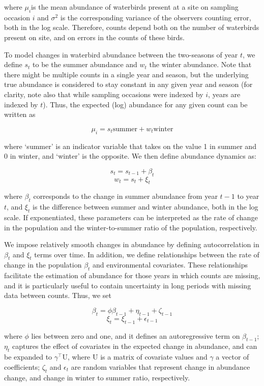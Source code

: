 \documentclass[utf8]{frontiersSCNS}
\begin{document}
where \(\mu_i\)is the mean abundance of waterbirds present at a site on
sampling occasion \(i\) and \(\sigma^2\) is the corresponding variance
of the observers counting error, both in the log scale. Therefore,
counts depend both on the number of waterbirds present on site, and on
errors in the counts of these birds.

To model changes in waterbird abundance between the two-seasons of year
\(t\), we define \(s_t\) to be the summer abundance and \(w_t\) the
winter abundance. Note that there might be multiple counts in a single
year and season, but the underlying true abundance is considered to stay
constant in any given year and season (for clarity, note also that while
sampling occasions were indexed by \(i\), years are indexed by \(t\)).
Thus, the expected (log) abundance for any given count can be written as

\[\mu_{i} = s_t \textrm{summer} + w_t \textrm{winter}\]

where `summer' is an indicator variable that takes on the value 1 in
summer and 0 in winter, and `winter' is the opposite. We then define
abundance dynamics as:

\[s_t = s_{t-1} + \beta_t\] \[w_t = s_t + \xi_t\]

where \(\beta_t\) corresponds to the change in summer abundance from
year \(t-1\) to year \(t\), and \(\xi_t\) is the difference between
summer and winter abundance, both in the log scale. If exponentiated,
these parameters can be interpreted as the rate of change in the
population and the winter-to-summer ratio of the population,
respectively.

We impose relatively smooth changes in abundance by defining
autocorrelation in \(\beta_t\) and \(\xi_t\) terms over time. In
addition, we define relationships between the rate of change in the
population \(\beta_t\) and environmental covariates. These relationships
facilitate the estimation of abundance for those years in which counts
are missing, and it is particularly useful to contain uncertainty in
long periods with missing data between counts. Thus, we set

\[\beta_{t} = \phi\beta_{t-1} + \eta_{t-1} + \zeta_{t-1}\]
\[\xi_{t} = \xi_{t-1} + \epsilon_{t-1}\]

where \(\phi\) lies between zero and one, and it defines an
autoregressive term on \(\beta_{t-1}\); \(\eta_t\) captures the effect
of covariates in the expected change in abundance, and can be expanded
to \(\gamma^{\intercal}\mathrm{U}\), where \(\mathrm{U}\) is a matrix of
covariate values and \(\gamma\) a vector of coefficients; \(\zeta_t\)
and \(\epsilon_t\) are random variables that represent change in
abundance change, and change in winter to summer ratio, respectively.
\end{document}
